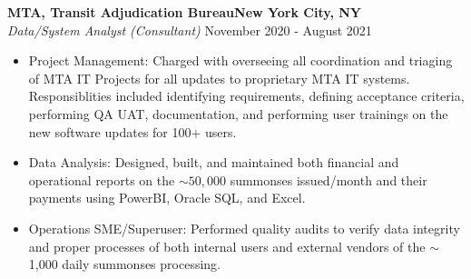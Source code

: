 \documentclass[a4paper]{article}
\begin{document}
\textbf{MTA, Transit Adjudication Bureau\hfill New York City, NY}\\
\textit{Data/System Analyst (Consultant)} \hfill November 2020 - August 2021\\
\vspace{-1mm}
\begin{itemize} \itemsep 1pt
    \item Project Management: Charged with overseeing all coordination and triaging of MTA IT Projects for all updates to proprietary MTA IT systems.
            Responsiblities included identifying requirements, defining acceptance criteria, performing QA UAT, documentation, and performing user trainings on the new software updates for 100+ users.
	\item Data Analysis: Designed, built, and maintained both financial and operational reports on the $\sim 50,000$ summonses issued/month and their payments using PowerBI, Oracle SQL, and Excel.
    \item Operations SME/Superuser: Performed quality audits to verify data integrity and proper processes of both internal users and external vendors of the $\sim$ 1,000 daily summonses processing.
\end{itemize}
\end{document}
